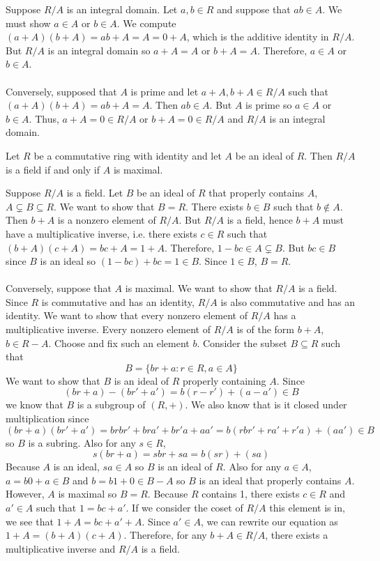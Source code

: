 \documentclass{mathnotes}
\begin{document}
\begin{bpf}
  Suppose $R/A$ is an integral domain. Let $a,b\in R$ and suppose that $ab\in
  A$. We must show $a\in A$ or $b\in A$. We compute $(a+A)(b+A)=ab+A=A=0+A$,
  which is the additive identity in $R/A$. But $R/A$ is an integral domain so
  $a+A=A$ or $b+A=A$. Therefore, $a\in A$ or $b\in A$.\\\\
  Conversely, supposed that $A$ is prime and let $a+A,b+A\in R/A$ such that
  $(a+A)(b+A)=ab+A=A$. Then $ab\in A$. But $A$ is prime so $a\in A$ or $b\in
  A$. Thus, $a+A=0\in R/A$ or $b+A=0\in R/A$ and $R/A$ is an integral domain.
\end{bpf}

\begin{bthm}
  Let $R$ be a commutative ring with identity and let $A$ be an ideal of $R$.
  Then $R/A$ is a field if and only if $A$ is maximal.
\end{bthm}

\begin{bpf}
  Suppose $R/A$ is a field. Let $B$ be an ideal of $R$ that properly contains
  $A$, $A\subsetneq B\subseteq R$. We want to show that $B=R$. There exists
  $b\in B$ such that $b\notin A$. Then $b+A$ is a nonzero element of $R/A$.
  But $R/A$ is a field, hence $b+A$ must have a multiplicative inverse, i.e.
  there exists $c\in R$ such that $(b+A)(c+A)=bc+A=1+A$. Therefore, $1-bc\in
  A\subsetneq B$. But $bc\in B$ since $B$ is an ideal so $(1-bc)+bc=1\in B$.
  Since $1\in B$, $B=R$.\\\\
  Conversely, suppose that $A$ is maximal. We want to show that $R/A$ is a
  field. Since $R$ is commutative and has an identity, $R/A$ is also
  commutative and has an identity. We want to show that every nonzero element
  of $R/A$ has a multiplicative inverse. Every nonzero element of $R/A$ is of
  the form $b+A$, $b\in R-A$. Choose and fix such an element $b$. Consider the
  subset $B\subseteq R$ such that
  $$B=\{br+a:r\in R,a\in A\}$$
  We want to show that $B$ is an ideal of $R$ properly containing $A$. Since
  $$(br+a)-(br'+a')=b(r-r')+(a-a')\in B$$
  we know that $B$ is a subgroup of $(R,+)$. We also know that is it closed
  under multiplication since
  $$(br+a)(br'+a')=brbr'+bra'+br'a+aa'=b(rbr'+ra'+r'a)+(aa')\in B$$
  so $B$ is a subring. Also for any $s\in R$,
  $$s(br+a)=sbr+sa=b(sr)+(sa)$$
  Because $A$ is an ideal, $sa\in A$ so $B$ is an ideal of $R$. Also for any
  $a\in A$, $a=b0+a\in B$ and $b=b1+0\in B-A$ so $B$ is an ideal that properly
  contains $A$. However, $A$ is maximal so $B=R$. Because $R$ contains 1, there
  exists $c\in R$ and $a'\in A$ such that $1=bc+a'$. If we consider the coset
  of $R/A$ this element is in, we see that $1+A=bc+a'+A$. Since $a'\in A$, we
  can rewrite our equation as $1+A=(b+A)(c+A)$. Therefore, for any $b+A\in
  R/A$, there exists a multiplicative inverse and $R/A$ is a field.
\end{bpf}
\end{document}
